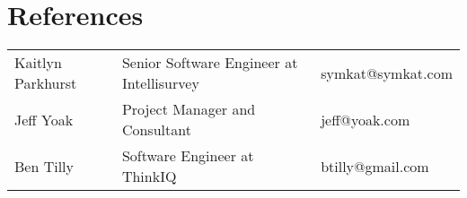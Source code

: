 \documentclass[table,tmargin=1in,bmargin=1in,letterpaper]{resume}
\begin{document}
\section{References}
\begin{tabular}{lll}
\rowcolor{white} Kaitlyn Parkhurst & Senior Software Engineer at Intellisurvey & symkat@symkat.com \\
\rowcolor{lightgray} Jeff Yoak & Project Manager and Consultant & jeff@yoak.com \\
\rowcolor{white} Ben Tilly & Software Engineer at ThinkIQ & btilly@gmail.com
\end{tabular}
\end{document}
